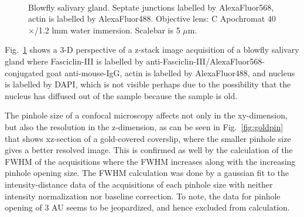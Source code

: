 \begin{figure}[h!]
\centering
{}\hspace{0.1em}
\hspace{0.1em}
\\
\caption{Blowfly salivary gland. 
Septate junctions labelled by AlexaFluor568, actin is labelled by AlexaFluor488. 
Objective lens: C Apochromat 40$\times$/1.2 lmm water immersion. 
Scalebar is 5 $\mu$m.}
\label{fig:what}
\end{figure}

Fig.~\ref{fig:what} shows a 3-D perspective of a z-stack image acquisition of a blowfly salivary gland where Fasciclin-III is labelled by anti-Fasciclin-III/AlexaFluor568-conjugated goat anti-mouse-IgG, actin is labelled by AlexaFluor488, and nucleus is labelled by DAPI, which is not visible perhaps due to the possibility that the nucleus has diffused out of the sample because the sample is old. 

The pinhole size of a confocal microscopy affects not only in the xy-dimension, but also the resolution in the z-dimension, as can be seen in Fig.~\ref{fig:goldpin} that shows xz-section of a gold-covered coverslip, where the smaller pinhole size gives a better resolved image. 
This is confirmed as well by the calculation of the FWHM of the acquisitions where the FWHM increases along with the increasing pinhole opening size. 
The FWHM calculation was done by a gaussian fit to the intensity-distance data of the acquisitions of each pinhole size with neither intensity normalization nor baseline correction. 
To note, the data for pinhole opening of 3 AU seems to be jeopardized, and hence excluded from calculation. 

